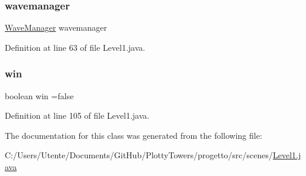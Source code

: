 \subsubsection{\texorpdfstring{wavemanager}{wavemanager}}
{\footnotesize\ttfamily \hyperlink{classmanagers_1_1_wave_manager}{Wave\+Manager} wavemanager\hspace{0.3cm}{\ttfamily [private]}}



Definition at line 63 of file Level1.\+java.

\mbox{\label{classscenes_1_1_level1_a1cc7b399bb950a160021766cd9a126f8}} 
\subsubsection{\texorpdfstring{win}{win}}
{\footnotesize\ttfamily boolean win =false\hspace{0.3cm}{\ttfamily [private]}}



Definition at line 105 of file Level1.\+java.



The documentation for this class was generated from the following file\+:\begin{DoxyCompactItemize}
\item 
C\+:/\+Users/\+Utente/\+Documents/\+Git\+Hub/\+Plotty\+Towers/progetto/src/scenes/\hyperlink{_level1_8java}{Level1.\+java}\end{DoxyCompactItemize}

